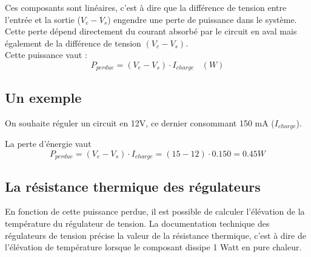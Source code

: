 
  Ces composants sont linéaires, c'est à dire que la différence de tension entre l'entrée et la sortie ($V_{e}-V_s$) 
  engendre une perte de puissance dans le système.\\
  Cette perte dépend directement du courant absorbé par le circuit en aval mais également de la différence de tension $(V_e-V_s)$.\\
  Cette puissance vaut : $$ P_{perdue} =(V_e-V_s)\cdot I_{charge} ~~~~(W)$$

  \subsection{Un exemple}

  On souhaite réguler un circuit en 12V, ce dernier consommant 150 mA ($I_{charge}$).

  La perte d'énergie vaut $$ P_{perdue} =(V_e-V_s)\cdot I_{charge} =(15-12)\cdot 0.150 = 0.45 W$$

  \subsection{La résistance thermique  des régulateurs}
  En fonction de cette puissance perdue, il est possible de calculer l’élévation de la température du régulateur de tension.
  La documentation technique des régulateurs de tension précise la valeur de la résistance thermique, c'est à dire de l'élévation de température lorsque le composant dissipe 1 Watt en pure chaleur.

